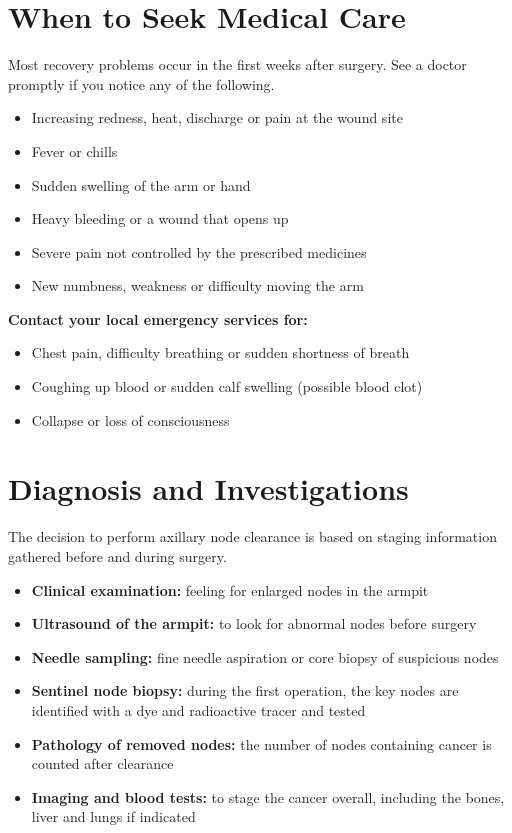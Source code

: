 \section*{When to Seek Medical Care}
Most recovery problems occur in the first weeks after surgery. See a doctor promptly if you notice any of the following.

\begin{itemize}
    \item Increasing redness, heat, discharge or pain at the wound site
    \item Fever or chills
    \item Sudden swelling of the arm or hand
    \item Heavy bleeding or a wound that opens up
    \item Severe pain not controlled by the prescribed medicines
    \item New numbness, weakness or difficulty moving the arm
\end{itemize}

\textbf{Contact your local emergency services for:}
\begin{itemize}
    \item Chest pain, difficulty breathing or sudden shortness of breath
    \item Coughing up blood or sudden calf swelling (possible blood clot)
    \item Collapse or loss of consciousness
\end{itemize}

\section*{Diagnosis and Investigations}
The decision to perform axillary node clearance is based on staging information gathered before and during surgery.

\begin{itemize}
    \item \textbf{Clinical examination:} feeling for enlarged nodes in the armpit
    \item \textbf{Ultrasound of the armpit:} to look for abnormal nodes before surgery
    \item \textbf{Needle sampling:} fine needle aspiration or core biopsy of suspicious nodes
    \item \textbf{Sentinel node biopsy:} during the first operation, the key nodes are identified with a dye and radioactive tracer and tested
    \item \textbf{Pathology of removed nodes:} the number of nodes containing cancer is counted after clearance
    \item \textbf{Imaging and blood tests:} to stage the cancer overall, including the bones, liver and lungs if indicated
\end{itemize}

